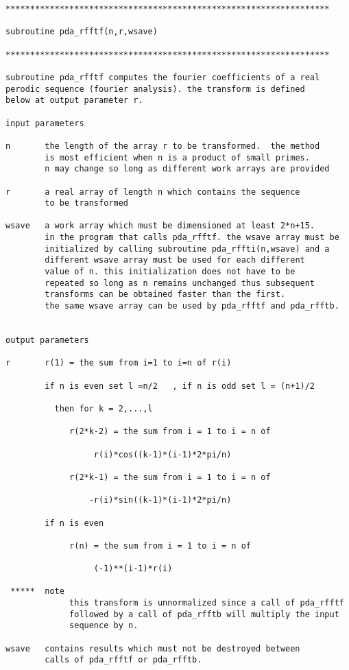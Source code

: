 

\begin{verbatim}
******************************************************************

subroutine pda_rfftf(n,r,wsave)

******************************************************************

subroutine pda_rfftf computes the fourier coefficients of a real
perodic sequence (fourier analysis). the transform is defined
below at output parameter r.

input parameters

n       the length of the array r to be transformed.  the method
        is most efficient when n is a product of small primes.
        n may change so long as different work arrays are provided

r       a real array of length n which contains the sequence
        to be transformed

wsave   a work array which must be dimensioned at least 2*n+15.
        in the program that calls pda_rfftf. the wsave array must be
        initialized by calling subroutine pda_rffti(n,wsave) and a
        different wsave array must be used for each different
        value of n. this initialization does not have to be
        repeated so long as n remains unchanged thus subsequent
        transforms can be obtained faster than the first.
        the same wsave array can be used by pda_rfftf and pda_rfftb.


output parameters

r       r(1) = the sum from i=1 to i=n of r(i)

        if n is even set l =n/2   , if n is odd set l = (n+1)/2

          then for k = 2,...,l

             r(2*k-2) = the sum from i = 1 to i = n of

                  r(i)*cos((k-1)*(i-1)*2*pi/n)

             r(2*k-1) = the sum from i = 1 to i = n of

                 -r(i)*sin((k-1)*(i-1)*2*pi/n)

        if n is even

             r(n) = the sum from i = 1 to i = n of

                  (-1)**(i-1)*r(i)

 *****  note
             this transform is unnormalized since a call of pda_rfftf
             followed by a call of pda_rfftb will multiply the input
             sequence by n.

wsave   contains results which must not be destroyed between
        calls of pda_rfftf or pda_rfftb.
\end{verbatim}

